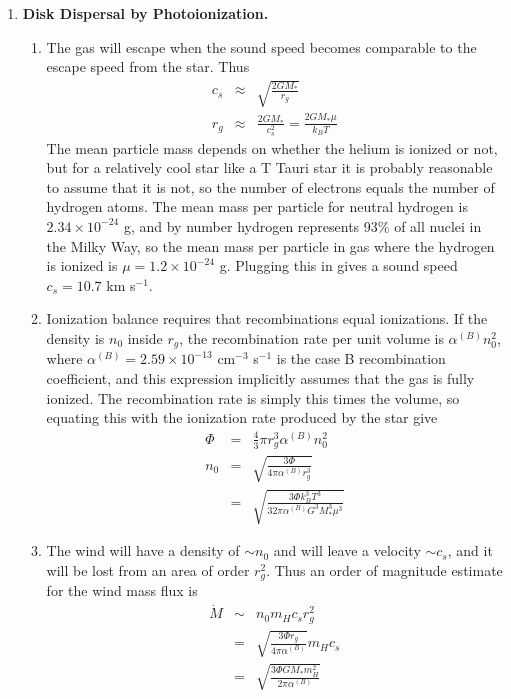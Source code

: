 \begin{enumerate}
\begin{enumerate}
\end{enumerate}


\item {\bf Disk Dispersal by Photoionization.}

\begin{enumerate}

\item The gas will escape when the sound speed becomes comparable to the escape speed from the star. Thus
\begin{eqnarray*}
c_s & \approx & \sqrt{\frac{2 G M_*}{r_g}}\\
r_g & \approx & \frac{2 G M_*}{c_s^2} = \frac{2 G M_* \mu}{k_B T}
\end{eqnarray*}
The mean particle mass depends on whether the helium is ionized or not, but for a relatively cool star like a T Tauri star it is probably reasonable to assume that it is not, so the number of electrons equals the number of hydrogen atoms. The mean mass per particle for neutral hydrogen is $2.34\times 10^{-24}$ g, and by number hydrogen represents 93\% of all nuclei in the Milky Way, so the mean mass per particle in gas where the hydrogen is ionized is $\mu=1.2\times 10^{-24}$ g. Plugging this in gives a sound speed $c_s = 10.7$ km s$^{-1}$.

\item Ionization balance requires that recombinations equal ionizations. If the density is $n_0$ inside $r_g$, the recombination rate per unit volume is $\alpha^{(B)} n_0^2$, where $\alpha^{(B)}=2.59\times 10^{-13}$ cm$^{-3}$ s$^{-1}$ is the case B recombination coefficient, and this expression implicitly assumes that the gas is fully ionized. The recombination rate is simply this times the volume, so equating this with the ionization rate produced by the star give
\begin{eqnarray*}
\Phi & = & \frac{4}{3}\pi r_g^3 \alpha^{(B)} n_0^2 \\
n_0 & = & \sqrt{\frac{3\Phi}{4\pi \alpha^{(B)} r_g^3}} \\
& = & \sqrt{\frac{3\Phi k_B^3 T^3}{32\pi \alpha^{(B)} G^3 M_*^3 \mu^3}}
\end{eqnarray*}

\item The wind will have a density of $\sim n_0$ and will leave a velocity $\sim c_s$, and it will be lost from an area of order $r_g^2$. Thus an order of magnitude estimate for the wind mass flux is
\begin{eqnarray*}
\dot{M} & \sim & n_0 m_H c_s r_g^2 \\
& = & \sqrt{\frac{3\Phi r_g}{4\pi \alpha^{(B)}}} m_H c_s \\
& = & \sqrt{\frac{3\Phi G M_* m_H^2}{2\pi \alpha^{(B)}}}
\end{eqnarray*}


\end{enumerate}
\end{enumerate}
